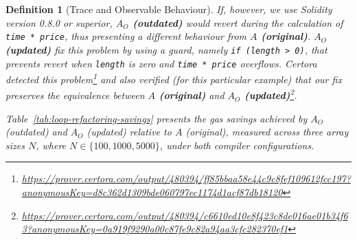 \documentclass[manuscript,screen,review]{acmart}
\newtheorem{definition}{Definition}
\begin{document}
\begin{definition}[Trace and Observable Behaviour]
If, however, we use Solidity version 0.8.0 or superior, {\bf $A_O$ (outdated)} would revert during the calculation of \texttt{time * price}, thus presenting a different behaviour from {\bf $A$ (original)}. {\bf $A_O$ (updated)} fix this problem by using a guard, namely \texttt{if (length > 0)}, that prevents revert when \texttt{length} is zero and \texttt{time * price} overflows. Certora detected this problem\footnote{\url{ https://prover.certora.com/output/480394/ff85bbaa58e44c9c8fef109612fcc197?anonymousKey=d8c362d1309bde060797ec1174d1acf87db18120}} and also verified (for this particular example) that our fix preserves the equivalence between {\bf $A$ (original)} and {\bf $A_O$ (updated)}\footnote{\url{https://prover.certora.com/output/480394/c6610ed10e8f423c8de016ae01b34f63?anonymousKey=0a919f9290a00c87fe9c82a94aa3cfc282370ef1}}.

Table~\ref{tab:loop-refactoring-savings} presents the gas savings achieved by $A_O$ (outdated) and $A_O$ (updated) relative to $A$ (original), measured across three array sizes $N$, where $N \in \{100, 1000, 5000\}$, under both compiler configurations.


\end{definition}
\end{document}
